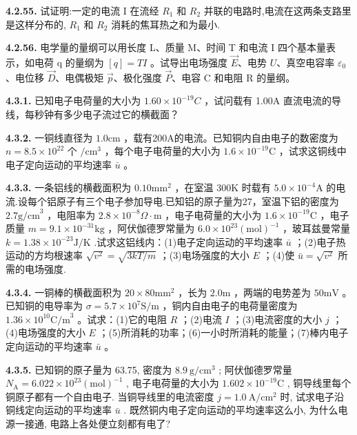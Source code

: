 \textbf{4.2.55.} 试证明:一定的电流 I 在流经 $R_{1}$ 和 $R_{2}$ 并联的电路时,电流在这两条支路里是这样分布的, $R_{1}$ 和 $R_{2}$ 消耗的焦耳热之和为最小.

\vfill
\newpage

\textbf{4.2.56.} 电学量的量纲可以用长度 L、质量 M、时间 T 和电流 I 四个基本量表示，如电荷 q 的量纲为 $[q] = TI$ 。试导出电场强度 $\vec{E}$、电势 $U$、真空电容率 $\varepsilon_{0}$ 、电位移 $\vec{D}$、电偶极矩 $\vec{p}$、极化强度 $\vec{P}$、电容 C 和电阻 R 的量纲。

\vfill
\newpage

\textbf{4.3.1.} 已知电子电荷量的大小为 $1.60 \times 10^{-19}C$ ，试问载有 1.00A 直流电流的导线，每秒钟有多少电子流过它的横截面？

\vfill
\newpage

\textbf{4.3.2.} 一铜线直径为 $1.0\mathrm{cm}$ ，载有200A的电流。已知铜内自由电子的数密度为 $n = 8.5\times 10^{22}$ 个 $/ \mathrm{cm}^3$ ，每个电子电荷量的大小为 $1.6\times 10^{-19}\mathrm{C}$ ，试求这铜线中电子定向运动的平均速率 $\bar{u}$ 。

\vfill
\newpage

\textbf{4.3.3.} 一条铝线的横截面积为 $0.10\mathrm{mm}^2$ ，在室温 $300\mathrm{K}$ 时载有 $5.0\times 10^{-4}\mathrm{A}$ 的电流.设每个铝原子有三个电子参加导电.已知铝的原子量为27，室温下铝的密度为 $2.7\mathrm{g / cm}^3$ ，电阻率为 $2.8\times 10^{-8}\Omega \cdot \mathrm{m}$ ，电子电荷量的大小为 $1.6\times 10^{-19}\mathrm{C}$ ，电子质量 $m = 9.1\times 10^{-31}\mathrm{kg}$ ，阿伏伽德罗常量为 $6.0\times 10^{23}(\mathrm{mol})^{-1}$ ，玻耳兹曼常量 $k = 1.38\times 10^{-23}\mathrm{J / K}$ .试求这铝线内：(1)电子定向运动的平均速率 $\bar{u}$ ；(2)电子热运动的方均根速率 $\sqrt{v^2} = \sqrt{3kT / m}$ ；(3)电场强度的大小 $E$ ；(4)使 $\bar{u} = \sqrt{v^2}$ 所需的电场强度.

\vfill
\newpage

\textbf{4.3.4.} 一铜棒的横截面积为 $20 \times 80\mathrm{mm}^2$ ，长为 $2.0\mathrm{m}$ ，两端的电势差为 $50\mathrm{mV}$ 。已知铜的电导率为 $\sigma = 5.7 \times 10^{7}\mathrm{S/m}$ ，铜内自由电子的电荷量密度为 $1.36 \times 10^{10}\mathrm{C/m}^{3}$ 。试求：(1)它的电阻 $R$ ；(2)电流 $I$ ；(3)电流密度的大小 $j$ ；(4)电场强度的大小 $E$ ；(5)所消耗的功率；(6)一小时所消耗的能量；(7)棒内电子定向运动的平均速率 $\bar{u}$ 。

\vfill
\newpage

\textbf{4.3.5.} 已知铜的原子量为 63.75, 密度为 $8.9 \mathrm{~g} / \mathrm{cm}^{3}$ ; 阿伏伽德罗常量 $N_{\mathrm{A}} = 6.022 \times 10^{23} (\mathrm{mol})^{-1}$ , 电子电荷量的大小为 $1.602 \times 10^{-19} \mathrm{C}$ , 铜导线里每个铜原子都有一个自由电子. 当铜导线里的电流密度 $j = 1.0 \mathrm{~A} / \mathrm{cm}^{2}$ 时, 试求电子沿铜线定向运动的平均速率 $\bar{u}$ . 既然铜内电子定向运动的平均速率这么小, 为什么电源一接通, 电路上各处便立刻都有电了?

